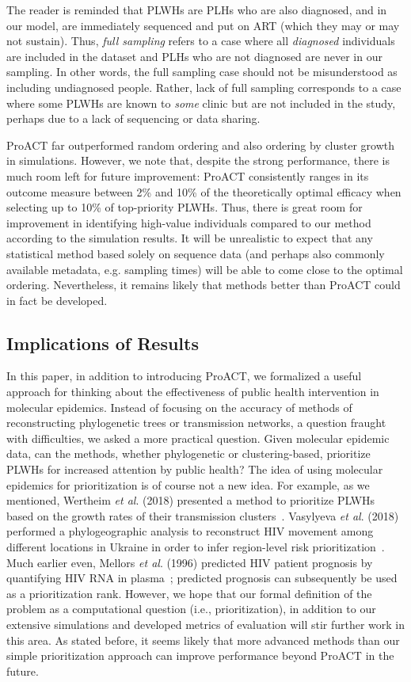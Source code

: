 The reader is reminded that \glspl{PLWH} are \glspl{PLH} who are also diagnosed, and in our model, are immediately sequenced and put on \gls{ART} (which they may or may not sustain). Thus, \textit{full sampling} refers to a case where all \textit{diagnosed} individuals are included in the dataset and \glspl{PLH} who are not diagnosed are never in our sampling. In other words, the full sampling case should not be misunderstood as including undiagnosed people. Rather, lack of full sampling corresponds to a case where some \glspl{PLWH} are known to \textit{some} clinic but are not included in the study, perhaps due to a lack of sequencing or data sharing.

ProACT far outperformed random ordering and also ordering by cluster growth in simulations. However, we note that, despite the strong performance, there is much room left for future improvement: ProACT consistently ranges in its outcome measure between 2\% and 10\% of the theoretically optimal efficacy when selecting up to 10\% of top-priority \glspl{PLWH}. Thus, there is great room for improvement in identifying high-value individuals compared to our method according to the simulation results. It will be unrealistic to expect that any statistical method based solely on sequence data (and perhaps also commonly available metadata, e.g. sampling times) will be able to come close to the optimal ordering. Nevertheless, it remains likely that methods better than ProACT could in fact be developed.

\subsection{Implications of Results}
In this paper, in addition to introducing ProACT, we formalized a useful approach for thinking about the effectiveness of public health intervention in molecular epidemics. Instead of focusing on the accuracy of methods of reconstructing phylogenetic trees or transmission networks, a question fraught with difficulties, we asked a more practical question. Given molecular epidemic data, can the methods, whether phylogenetic or clustering-based, prioritize \glspl{PLWH} for increased attention by public health? The idea of using molecular epidemics for prioritization is of course not a new idea. For example, as we mentioned, Wertheim \textit{et al}. (2018) presented a method to prioritize \glspl{PLWH} based on the growth rates of their transmission clusters~\cite{Wertheim2018}. Vasylyeva \textit{et al}. (2018) performed a phylogeographic analysis to reconstruct \gls{HIV} movement among different locations in Ukraine in order to infer region-level risk prioritization~\cite{Vasylyeva2018}. Much earlier even, Mellors \textit{et al}. (1996) predicted \gls{HIV} patient prognosis by quantifying \gls{HIV} \gls{RNA} in plasma~\cite{Mellors1996}; predicted prognosis can subsequently be used as a prioritization rank. However, we hope that our formal definition of the problem as a computational question (i.e., prioritization), in addition to our extensive simulations and developed metrics of evaluation will stir further work in this area. As stated before, it seems likely that more advanced methods than our simple prioritization approach can improve performance beyond ProACT in the future.

